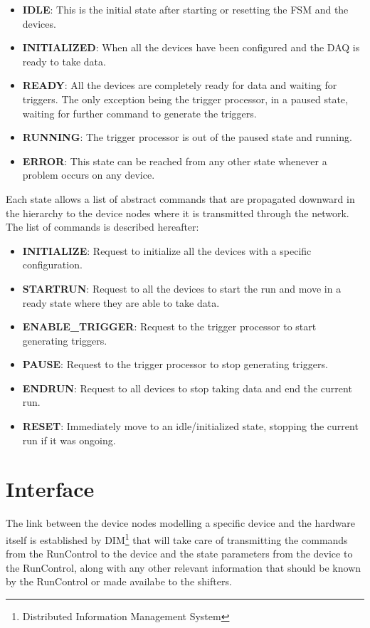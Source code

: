 \documentclass[a4paper]{article}
\begin{document}
\begin{itemize}
	\item \textbf{IDLE}: This is the initial state after starting or resetting the FSM and the devices.
	\item \textbf{INITIALIZED}: When all the devices have been configured and the DAQ is ready to take
	data.
	\item \textbf{READY}: All the devices are completely ready for data and waiting for triggers. The
	only exception being the trigger processor, in a paused state, waiting for further command to generate
	the triggers.
	\item \textbf{RUNNING}: The trigger processor is out of the paused state and running.
	\item \textbf{ERROR}: This state can be reached from any other state whenever a problem occurs on
	any device.
\end{itemize}

Each state allows a list of abstract commands that are propagated downward in the hierarchy to
the device nodes where it is transmitted through the network. The list of commands is described
hereafter:

\begin{itemize}
	\item \textbf{INITIALIZE}: Request to initialize all the devices with a specific configuration.
	\item \textbf{STARTRUN}: Request to all the devices to start the run and move in a ready state
	where they are able to take data.
	\item \textbf{ENABLE\_TRIGGER}: Request to the trigger processor to start generating triggers.
	\item \textbf{PAUSE}: Request to the trigger processor to stop generating triggers.
	\item \textbf{ENDRUN}: Request to all devices to stop taking data and end the current run. 
	\item \textbf{RESET}: Immediately move to an idle/initialized state, stopping the current run if
	it was ongoing.
\end{itemize}

\section{Interface}
The link between the device nodes modelling a specific device and the hardware itself is
established by DIM\cite{biblio:DIM}\footnote{Distributed Information Management System} that will
take care of transmitting the commands from the RunControl to the device and the state parameters from the
device to the RunControl, along with any other relevant information that should be known by the
RunControl or made availabe to the shifters.
\end{document}
